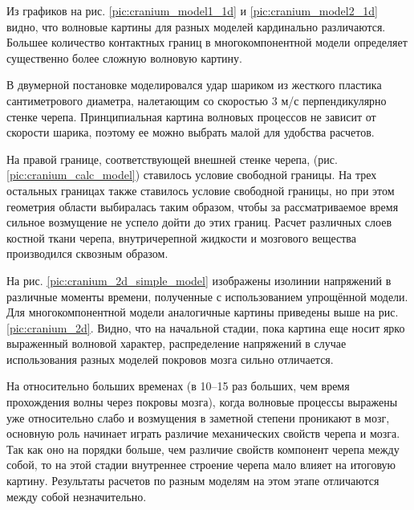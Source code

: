 Из графиков на рис. \ref{pic:cranium_model1_1d} и \ref{pic:cranium_model2_1d} видно, что волновые картины для разных моделей кардинально различаются. Большее количество контактных границ в многокомпонентной модели определяет существенно более сложную волновую картину.

В двумерной постановке моделировался удар шариком из жесткого пластика сантиметрового диаметра, налетающим со скоростью 3 м/с перпендикулярно стенке черепа. Принципиальная картина волновых процессов не зависит от скорости шарика, поэтому ее можно выбрать малой для удобства расчетов. 

На правой границе, соответствующей внешней стенке черепа, (рис. \ref{pic:cranium_calc_model}) ставилось условие свободной границы. На трех остальных границах также ставилось условие свободной границы, но при этом геометрия области выбиралась таким образом, чтобы за рассматриваемое время сильное возмущение не успело дойти до этих границ. Расчет различных слоев костной ткани черепа, внутричерепной жидкости и мозгового вещества производился сквозным образом.

На рис. \ref{pic:cranium_2d_simple_model} изображены изолинии напряжений в различные моменты времени, полученные с использованием упрощённой модели. Для многокомпонентной модели аналогичные картины приведены выше на рис. \ref{pic:cranium_2d}. Видно, что на начальной стадии, пока картина еще носит ярко выраженный волновой характер, распределение напряжений в случае использования разных моделей покровов мозга сильно отличается.

На относительно больших временах (в 10--15 раз больших, чем время прохождения волны через покровы мозга), когда волновые процессы выражены уже относительно слабо и возмущения в заметной степени проникают в мозг, основную роль начинает играть различие механических свойств черепа и мозга. Так как оно на порядки больше, чем различие свойств компонент черепа между собой, то на этой стадии внутреннее строение черепа мало влияет на итоговую картину. Результаты расчетов по разным моделям на этом этапе отличаются между собой незначительно.


